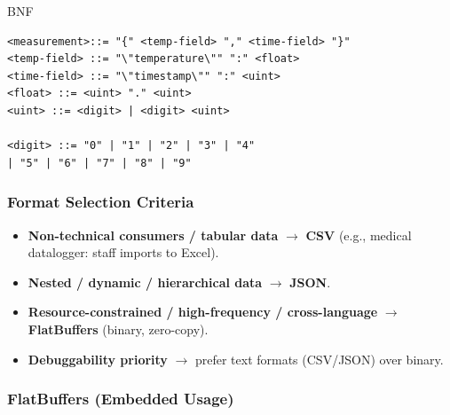 \begin{minipage}[t]{0.74\columnwidth}
BNF
\vspace*{-0.2cm}
\begin{lstlisting}[morekeywords={[2]measurement, temp-field, time-field, uint, digit}]
<measurement>::= "{" <temp-field> "," <time-field> "}"
<temp-field> ::= "\"temperature\"" ":" <float>
<time-field> ::= "\"timestamp\"" ":" <uint>
<float> ::= <uint> "." <uint>
<uint> ::= <digit> | <digit> <uint>

<digit> ::= "0" | "1" | "2" | "3" | "4"
| "5" | "6" | "7" | "8" | "9"
\end{lstlisting}
\end{minipage}
\vspace*{-0.4cm}
    \subsubsection{Format Selection Criteria}

    \begin{itemize}
      \item \textbf{Non-technical consumers / tabular data} $\rightarrow$ \textbf{CSV} (e.g., medical datalogger: staff imports to Excel).
      \item \textbf{Nested / dynamic / hierarchical data} $\rightarrow$ \textbf{JSON}.
      \item \textbf{Resource-constrained / high-frequency / cross-language} $\rightarrow$ \textbf{FlatBuffers} (binary, zero-copy).
      \item \textbf{Debuggability priority} $\rightarrow$ prefer text formats (CSV/JSON) over binary.
    \end{itemize}

  \subsubsection{FlatBuffers (Embedded Usage)}

